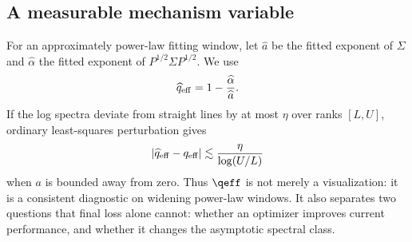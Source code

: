 \subsection{A measurable mechanism variable}

For an approximately power-law fitting window, let $\widehat a$ be the fitted exponent of $\Sigma$ and $\widehat\alpha$ the fitted exponent of $P^{1/2}\Sigma P^{1/2}$.  We use
\[
 \widehat q_{\rm eff}=1-\frac{\widehat\alpha}{\widehat a}.
\]
If the log spectra deviate from straight lines by at most $\eta$ over ranks $[L,U]$, ordinary least-squares perturbation gives
\[
 |\widehat q_{\rm eff}-q_{\rm eff}|
 \lesssim\frac{\eta}{\log(U/L)}
\]
when $a$ is bounded away from zero.  Thus $\qeff$ is not merely a visualization: it is a consistent diagnostic on widening power-law windows.  It also separates two questions that final loss alone cannot: whether an optimizer improves current performance, and whether it changes the asymptotic spectral class.
